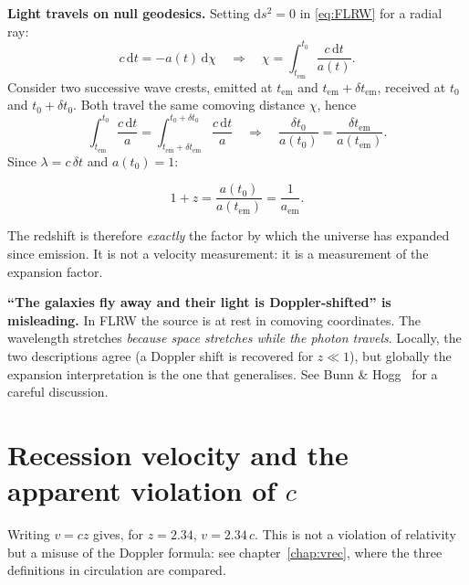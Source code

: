 \documentclass[11pt,a4paper,openany]{report}
\newcommand{\dif}{\mathrm{d}}
\begin{document}
\begin{tcolorbox}[undergrad]
\textbf{Light travels on null geodesics.} Setting $\dif s^{2} = 0$ in
\eqref{eq:FLRW} for a radial ray:
\begin{equation}
c\,\dif t = -a(t)\,\dif\chi
\quad\Longrightarrow\quad
\chi = \int_{t_{\text{em}}}^{t_{0}} \frac{c\,\dif t}{a(t)} .
\label{eq:null_geodesic}
\end{equation}
Consider two successive wave crests, emitted at $t_{\text{em}}$ and
$t_{\text{em}} + \delta t_{\text{em}}$, received at $t_{0}$ and
$t_{0} + \delta t_{0}$. Both travel the same comoving distance $\chi$, hence
\[
\int_{t_{\text{em}}}^{t_{0}} \frac{c\,\dif t}{a}
= \int_{t_{\text{em}}+\delta t_{\text{em}}}^{t_{0}+\delta t_{0}} \frac{c\,\dif t}{a}
\quad\Longrightarrow\quad
\frac{\delta t_{0}}{a(t_0)} = \frac{\delta t_{\text{em}}}{a(t_{\text{em}})} .
\]
Since $\lambda = c\,\delta t$ and $a(t_0)=1$:
\end{tcolorbox}

\begin{equation}
\boxed{\;1 + z = \frac{a(t_{0})}{a(t_{\text{em}})} = \frac{1}{a_{\text{em}}} .\;}
\label{eq:z_FLRW}
\end{equation}

\noindent The redshift is therefore \emph{exactly} the factor by which the
universe has expanded since emission. It is not a velocity measurement: it is a
measurement of the expansion factor.

\begin{tcolorbox}[warning]
\textbf{“The galaxies fly away and their light is Doppler-shifted” is
misleading.} In FLRW the source is at rest in comoving coordinates. The
wavelength stretches \emph{because space stretches while the photon travels}.
Locally, the two descriptions agree (a Doppler shift is recovered for
$z\ll1$), but globally the expansion interpretation is the one that
generalises. See Bunn \& Hogg~\cite{Bunn2009} for a careful discussion.
\end{tcolorbox}

\section{Recession velocity and the apparent violation of $c$}
\label{sec:vrec_intro}

Writing $v = cz$ gives, for $z = 2.34$, $v = 2.34\,c$. This is not a violation
of relativity but a misuse of the Doppler formula: see
chapter~\ref{chap:vrec}, where the three definitions in circulation are
compared.
\end{document}

